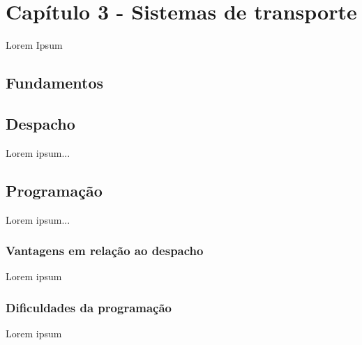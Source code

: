 
\newpage
\section{Capítulo 3 - Sistemas de transporte}
Lorem Ipsum

\subsection{Fundamentos}

\subsection{Despacho}
Lorem ipsum...

\subsection{Programação}
Lorem ipsum...

    \subsubsection{Vantagens em relação ao despacho}
    Lorem ipsum

    \subsubsection{Dificuldades da programação}
    Lorem ipsum